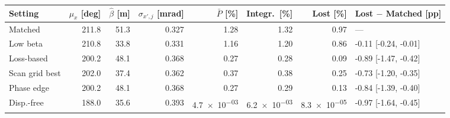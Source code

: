\begin{tabular}{lrrrrrrl}\toprule
Setting & $\mu_x$ [deg] & $\hat\beta$ [m] & $\sigma_{x',j}$ [mrad] & $\bar P$ [\%] & Integr.\ [\%] & Lost [\%] & Lost $-$ Matched [pp]\\\midrule
Matched & 211.8 & 51.3 & 0.327 & 1.28 & 1.32 & 0.97 & ---\\
Low beta & 210.8 & 33.8 & 0.331 & 1.16 & 1.20 & 0.86 & -0.11 [-0.24, -0.01]\\
Loss-based & 200.2 & 48.1 & 0.368 & 0.27 & 0.28 & 0.09 & -0.89 [-1.47, -0.42]\\
Scan grid best & 202.0 & 37.4 & 0.362 & 0.37 & 0.38 & 0.25 & -0.73 [-1.20, -0.35]\\
Phase edge & 200.2 & 48.1 & 0.368 & 0.27 & 0.29 & 0.13 & -0.84 [-1.39, -0.40]\\
Disp.-free & 188.0 & 35.6 & 0.393 & \num{4.7e-03} & \num{6.2e-03} & \num{8.3e-05} & -0.97 [-1.64, -0.45]\\
\bottomrule\end{tabular}
